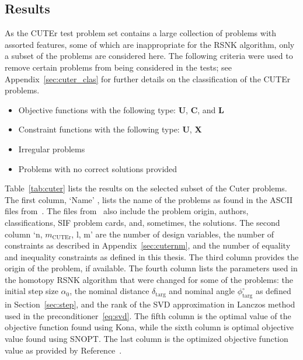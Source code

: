 \subsection{Results}
As the CUTEr test problem set contains a large collection of problems with assorted features, some of which are inappropriate for the RSNK algorithm, only a subset of the problems are considered here. The following criteria were used to remove certain problems from being considered in the tests; see Appendix~\ref{sec:cuter_clas} for further details on the classification of the CUTEr problems. 
\begin{itemize} \itemsep -8pt 
\item Objective functions with the following type: \textbf{U},  \textbf{C}, and \textbf{L}
\item Constraint functions with the following type: \textbf{U},  \textbf{X}
\item Irregular problems 
\item Problems with no correct solutions provided
\end{itemize}   %

Table~\ref{tab:cuter} lists the results on the selected subset of the Cuter problems. The first column, `Name' , lists the name of the problems 
as found in the ASCII files from~\cite{cuter_probs}.  The files from~\cite{cuter_probs} also include the
problem origin, authors, classifications, SIF problem cards, and, sometimes, the solutions. The second column `n,  $m_{\text{CUTEr}}$, l, m' are the number of design variables, the number of constraints as described in Appendix~\ref{sec:cuternm}, and the number of equality and inequality constraints as defined in this thesis. 
The third column provides the origin of the problem, if available. The fourth column lists the parameters used in the homotopy RSNK algorithm that were changed for some of the problems: the initial step size $\textbf{$\alpha_0$}$, the nominal distance  $\delta_{\text{targ}}$  and nominal angle $\phi^{\circ}_{\text{targ}}$ as defined in Section~\ref{sec:step}, and the rank of the SVD approximation in Lanczos method used in the preconditioner~\ref{eq:svd}. The fifth column is the optimal value of the  objective function found using Kona, while the sixth column is optimal objective value found using SNOPT. The last column is the optimized objective function value as provided by Reference~\cite{cuter_probs}. 

